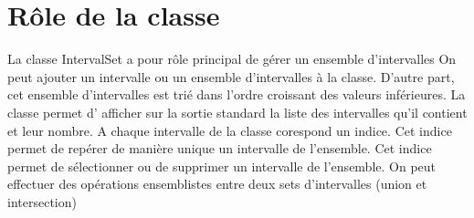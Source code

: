\documentclass[a4paper,french,10pt,twoside]{article}
\begin{document}
\part{Rôle de la classe}

La classe IntervalSet a pour rôle principal de gérer un ensemble d'intervalles
On peut ajouter un intervalle ou un ensemble d'intervalles à la classe.
D'autre part, cet ensemble d'intervalles est trié dans l'ordre croissant des valeurs inférieures.
La classe permet d' afficher sur la sortie standard la liste des intervalles qu'il contient et leur nombre.
A chaque intervalle de la classe corespond un indice. Cet indice permet de repérer de manière unique un intervalle de l'ensemble.
Cet indice permet de sélectionner ou de supprimer un intervalle de l'ensemble. 
On peut effectuer des opérations ensemblistes entre deux sets d'intervalles (union et intersection)
\end{document}
